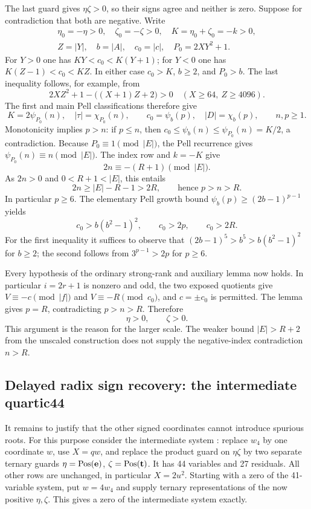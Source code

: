 The last guard gives \(\eta\zeta>0\), so their signs agree and neither
is zero.  Suppose for contradiction that both are negative.  Write
\[
\begin{gathered}
 \eta_0=-\eta>0,\quad\zeta_0=-\zeta>0,\quad
 K=\eta_0+\zeta_0=-k>0,\\
 Z=|Y|,\quad
 b=|A|,\quad c_0=|c|,\quad P_0=2XY^2+1.
\end{gathered}
\]
For \(Y>0\) one has \(KY<c_0<K(Y+1)\); for \(Y<0\) one has
\(K(Z-1)<c_0<KZ\).  In either case \(c_0>K\), \(b\geq2\), and
\(P_0>b\).  The last inequality follows, for example, from
\[
 2XZ^2+1-\big((X+1)Z+2\big)>0
 \quad(X\geq64,\ Z\geq4096).
\]
The first and main Pell classifications therefore give
\[
 K=2\psi_{P_0}(n),\quad |\tau|=\chi_{P_0}(n),\qquad
 c_0=\psi_b(p),\quad |D|=\chi_b(p),\qquad n,p\geq1.
\]
Monotonicity implies \(p>n\): if \(p\leq n\), then
\(c_0\leq\psi_b(n)\leq\psi_{P_0}(n)=K/2\), a contradiction.
Because \(P_0\equiv1\pmod{|E|}\), the Pell recurrence gives
\(\psi_{P_0}(n)\equiv n\pmod{|E|}\).  The index row and \(k=-K\)
give
\[
 2n\equiv-(R+1)\pmod{|E|}.
\]
As \(2n>0\) and \(0<R+1<|E|\), this entails
\[
 2n\geq |E|-R-1>2R,\qquad\text{hence }p>n>R.
\]
In particular \(p\geq6\).  The elementary Pell growth bound
\(\psi_b(p)\geq(2b-1)^{p-1}\) yields
\[
 c_0>b(b^2-1)^2,\qquad c_0>2p,\qquad c_0>2R.
\]
For the first inequality it suffices to observe that
\((2b-1)^5>b^5>b(b^2-1)^2\) for \(b\geq2\); the second follows
from \(3^{p-1}>2p\) for \(p\geq6\).

Every hypothesis of the ordinary strong-rank and auxiliary lemma now
holds.  In particular \(i=2r+1\) is nonzero and odd, the two exposed
quotients give \(V\equiv-c\pmod{|f|}\) and
\(V\equiv-R\pmod{c_0}\), and \(c=\pm c_0\) is permitted.  The
lemma gives \(p=R\), contradicting \(p>n>R\).  Therefore
\[
 \eta>0,\qquad\zeta>0.
\]
This argument is the reason for the larger scale.  The weaker bound
\(|E|>R+2\) from the unscaled construction does not supply the
negative-index contradiction \(n>R\).

\subsection{Delayed radix sign recovery: the intermediate quartic44}

It remains to justify that the other signed coordinates cannot introduce
spurious roots.  For this purpose consider the intermediate system
: replace \(w_4\) by one coordinate \(w\), use
\(X=qw\), and replace the product guard on \(\eta\zeta\) by two
separate ternary guards \(\eta=\operatorname{Pos}(\mathbf e)\),
\(\zeta=\operatorname{Pos}(\mathbf t)\).  It has 44 variables and 27 residuals.
All other rows are unchanged, in particular \(X=2u^2\).  Starting with
a zero of the 41-variable system, put \(w=4w_4\) and supply ternary
representations of the now positive \(\eta,\zeta\).  This gives a zero
of the intermediate system exactly.

